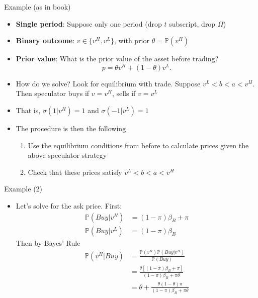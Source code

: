 \begin{frame}{Example (as in book)}
\begin{itemize}
	\item \textbf{Single period}: Suppose only one period (drop $t$ subscript, drop $\Omega$)
	\item \textbf{Binary outcome}: $v \in \{ v^H, v^L\}$, with prior $\theta=\mathbb{P}(v^H) $ 
	\item \textbf{Prior value}: What is the prior value of the asset before trading?
	\[
	p=\theta v^H+(1-\theta) v^L.
	\]
	\item How do we solve? Look for equilibrium with trade. Suppose $v^L < b < a < v^H$. Then speculator buys if $v=v^H$, sells if $v=v^L$
	\item That is, $\sigma(1|v^H)=1$ and $\sigma(-1|v^L)=1$
	\item The procedure is then the following
	\begin{enumerate}
		\item Use the equilibrium conditions from before to calculate prices given the above speculator strategy
		\item Check that these prices satisfy $v^L < b < a < v^H$
	\end{enumerate}
\end{itemize}
\end{frame}


\begin{frame}{Example (2)}
\begin{itemize}
	\item Let's solve for the ask price. First:
	\begin{align*}
		\mathbb{P}(Buy| v^H) & = (1-\pi) \beta_B + \pi \\
		\mathbb{P}(Buy| v^L) & = (1-\pi) \beta_B
	\end{align*}
	Then by Bayes' Rule
	\begin{align*}
		\mathbb{P}(v^H|Buy) & = \frac{\mathbb{P}(v^H) \mathbb{P}(Buy| v^H)}{\mathbb{P}(Buy)}  \\
		& = \frac{\theta [(1-\pi)\beta_B+\pi]}{(1-\pi)\beta_B+ \pi\theta}  \\
		& =  \theta + \frac{\theta(1-\theta) \pi}{(1-\pi)\beta_B+\pi\theta}
	\end{align*}
\end{itemize}
\end{frame}


